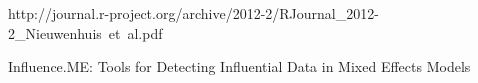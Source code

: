 http://journal.r-project.org/archive/2012-2/RJournal_2012-2_Nieuwenhuis~et~al.pdf

Influence.ME: Tools for Detecting Influential Data in Mixed Effects Models
